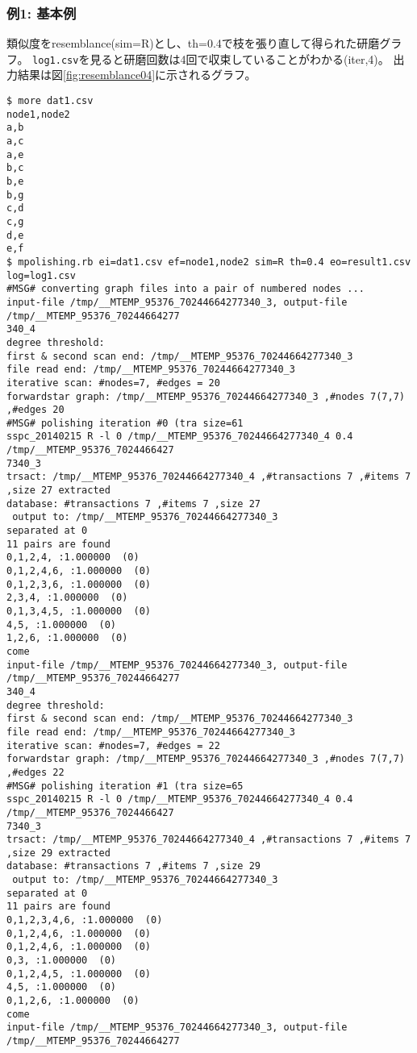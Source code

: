 \subsubsection*{例1: 基本例}

類似度をresemblance(sim=R)とし、th=0.4で枝を張り直して得られた研磨グラフ。
\verb|log1.csv|を見ると研磨回数は4回で収束していることがわかる(iter,4)。
出力結果は図\ref{fig:resemblance04}に示されるグラフ。



\begin{Verbatim}[baselinestretch=0.7,frame=single]
$ more dat1.csv
node1,node2
a,b
a,c
a,e
b,c
b,e
b,g
c,d
c,g
d,e
e,f
$ mpolishing.rb ei=dat1.csv ef=node1,node2 sim=R th=0.4 eo=result1.csv log=log1.csv
#MSG# converting graph files into a pair of numbered nodes ...
input-file /tmp/__MTEMP_95376_70244664277340_3, output-file /tmp/__MTEMP_95376_70244664277
340_4
degree threshold: 
first & second scan end: /tmp/__MTEMP_95376_70244664277340_3
file read end: /tmp/__MTEMP_95376_70244664277340_3
iterative scan: #nodes=7, #edges = 20
forwardstar graph: /tmp/__MTEMP_95376_70244664277340_3 ,#nodes 7(7,7) ,#edges 20
#MSG# polishing iteration #0 (tra size=61
sspc_20140215 R -l 0 /tmp/__MTEMP_95376_70244664277340_4 0.4 /tmp/__MTEMP_95376_7024466427
7340_3
trsact: /tmp/__MTEMP_95376_70244664277340_4 ,#transactions 7 ,#items 7 ,size 27 extracted 
database: #transactions 7 ,#items 7 ,size 27
 output to: /tmp/__MTEMP_95376_70244664277340_3
separated at 0
11 pairs are found
0,1,2,4, :1.000000  (0)
0,1,2,4,6, :1.000000  (0)
0,1,2,3,6, :1.000000  (0)
2,3,4, :1.000000  (0)
0,1,3,4,5, :1.000000  (0)
4,5, :1.000000  (0)
1,2,6, :1.000000  (0)
come
input-file /tmp/__MTEMP_95376_70244664277340_3, output-file /tmp/__MTEMP_95376_70244664277
340_4
degree threshold: 
first & second scan end: /tmp/__MTEMP_95376_70244664277340_3
file read end: /tmp/__MTEMP_95376_70244664277340_3
iterative scan: #nodes=7, #edges = 22
forwardstar graph: /tmp/__MTEMP_95376_70244664277340_3 ,#nodes 7(7,7) ,#edges 22
#MSG# polishing iteration #1 (tra size=65
sspc_20140215 R -l 0 /tmp/__MTEMP_95376_70244664277340_4 0.4 /tmp/__MTEMP_95376_7024466427
7340_3
trsact: /tmp/__MTEMP_95376_70244664277340_4 ,#transactions 7 ,#items 7 ,size 29 extracted 
database: #transactions 7 ,#items 7 ,size 29
 output to: /tmp/__MTEMP_95376_70244664277340_3
separated at 0
11 pairs are found
0,1,2,3,4,6, :1.000000  (0)
0,1,2,4,6, :1.000000  (0)
0,1,2,4,6, :1.000000  (0)
0,3, :1.000000  (0)
0,1,2,4,5, :1.000000  (0)
4,5, :1.000000  (0)
0,1,2,6, :1.000000  (0)
come
input-file /tmp/__MTEMP_95376_70244664277340_3, output-file /tmp/__MTEMP_95376_70244664277

\end{Verbatim}
